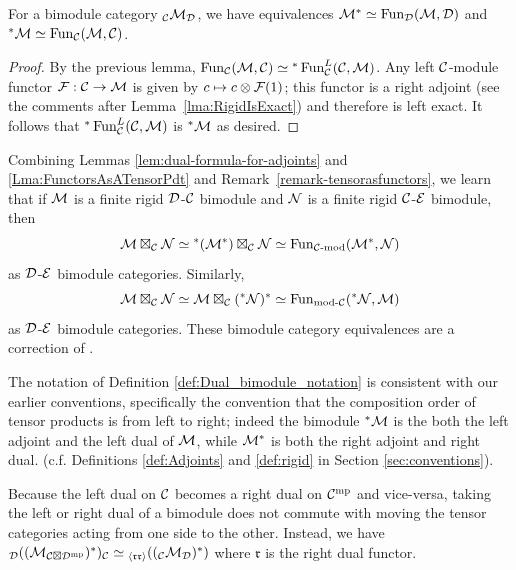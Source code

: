 \documentclass{amsart}
\begin{document}
\begin{lemma} \label{lem:dual-formula-for-adjoints}
For a bimodule category ${}_\mathcal C \mathcal M_\mathcal D$, we have equivalences $\mathcal M^* \simeq \operatorname{Fun}_{\mathcal D}(\mathcal M, \mathcal D)$ and ${}^*\mathcal M \simeq \operatorname{Fun}_{\mathcal C}(\mathcal M, \mathcal C)$.
\end{lemma}
\begin{proof}
By the previous lemma, $\operatorname{Fun}_{\mathcal C}(\mathcal M, \mathcal C) \simeq {}^*\operatorname{Fun}_{\mathcal C}^L(\mathcal C, \mathcal M)$.  Any left $\mathcal C$-module functor $\mathcal F: \mathcal C \rightarrow \mathcal M$ is given by $c \mapsto c \otimes \mathcal F(1)$; this functor is a right adjoint (see the comments after Lemma~\ref{lma:RigidIsExact}) and therefore is left exact.  It follows that ${}^*\operatorname{Fun}_{\mathcal C}^L(\mathcal C, \mathcal M)$ is ${}^* \mathcal M$ as desired.
\end{proof}

\begin{remark}
Combining Lemmas \ref{lem:dual-formula-for-adjoints} and \ref{Lma:FunctorsAsATensorPdt} and Remark~\ref{remark-tensorasfunctors}, we learn that if $\mathcal M$ is a finite rigid $\mathcal D$-$\mathcal C$ bimodule and $\mathcal N$ is a finite rigid $\mathcal C$-$\mathcal E$ bimodule, then 
\begin{equation*}
	\mathcal M \boxtimes_\mathcal C \mathcal N \simeq {}^*(\mathcal M^*) \boxtimes_\mathcal C \mathcal N \simeq \operatorname{Fun}_{\mathcal C\text{-mod}}(\mathcal M^*,\mathcal N)
\end{equation*}
as $\mathcal D$-$\mathcal E$ bimodule categories.   Similarly, 
\begin{equation*}
	\mathcal M \boxtimes_{\mathcal C} \mathcal N \simeq \mathcal M \boxtimes_\mathcal C ({}^*\mathcal N)^* \simeq \operatorname{Fun}_{\text{mod-}\mathcal C}({}^*\mathcal N,\mathcal M)
\end{equation*}
as $\mathcal D$-$\mathcal E$ bimodule categories.  These bimodule category equivalences are a correction of \cite[Remark 3.6]{0909.3140}.
\end{remark}

\begin{remark}
	The notation of Definition \ref{def:Dual_bimodule_notation} is consistent with our earlier conventions, specifically the convention that the composition order of tensor products is from left to right; indeed the bimodule ${}^*\mathcal M$ is the both the left adjoint and the left dual of $\mathcal M$, while $\mathcal M^*$ is both the right adjoint and right dual. (c.f. Definitions \ref{def:Adjoints} and \ref{def:rigid} in Section \ref{sec:conventions}). 
\end{remark}

\begin{warning}
Because the left dual on $\mathcal C$ becomes a right dual on $\mathcal C^{\mathrm{mp}}$ and vice-versa, taking the left or right dual of a bimodule does not commute with moving the tensor categories acting from one side to the other.  Instead, we have ${}_\mathcal D ((\mathcal M_{\mathcal C \boxtimes \mathcal D^{\mathrm{mp}}})^*)_\mathcal C \simeq {}_{\langle \mathfrak{r r} \rangle}(({}_\mathcal C \mathcal M_\mathcal D)^*)$ where $\mathfrak{r}$ is the right dual functor. 
\end{warning}
\end{document}
